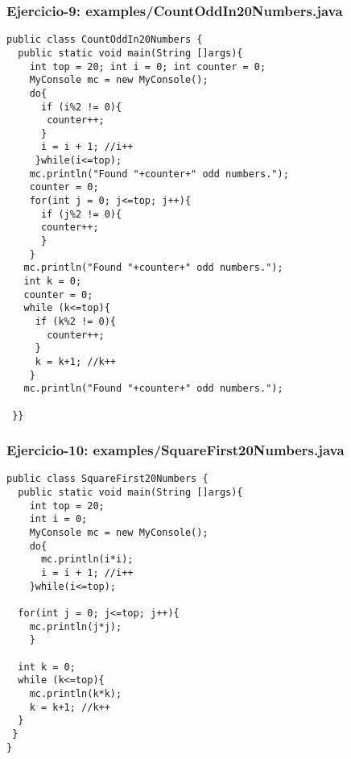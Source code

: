 \documentclass[xcolor=dvipsnames,dvip,notes=show,handout,table]{beamer}
\begin{document}


\begin{frame}[fragile]
\frametitle{Ejercicio-9: examples/CountOddIn20Numbers.java}
\tiny
\begin{lstlisting}
public class CountOddIn20Numbers {
  public static void main(String []args){
    int top = 20; int i = 0; int counter = 0;
    MyConsole mc = new MyConsole();
    do{
      if (i%2 != 0){
       counter++;
      }
      i = i + 1; //i++
     }while(i<=top);				
    mc.println("Found "+counter+" odd numbers.");
    counter = 0;
    for(int j = 0; j<=top; j++){
      if (j%2 != 0){
      counter++;
      }
    }
   mc.println("Found "+counter+" odd numbers.");
   int k = 0;
   counter = 0;
   while (k<=top){
     if (k%2 != 0){
       counter++;
     }
     k = k+1; //k++
    }
   mc.println("Found "+counter+" odd numbers.");

 }}
\end{lstlisting}
\end{frame}






\begin{frame}[fragile]
\frametitle{Ejercicio-10: examples/SquareFirst20Numbers.java}
\tiny
\begin{lstlisting}
public class SquareFirst20Numbers {
  public static void main(String []args){
    int top = 20;
    int i = 0;
    MyConsole mc = new MyConsole();
    do{
      mc.println(i*i);
      i = i + 1; //i++
    }while(i<=top);
  
  for(int j = 0; j<=top; j++){
    mc.println(j*j);
    }

  int k = 0;
  while (k<=top){
    mc.println(k*k);
    k = k+1; //k++
  }
 }
}
\end{lstlisting}
\end{frame}
\end{document}
